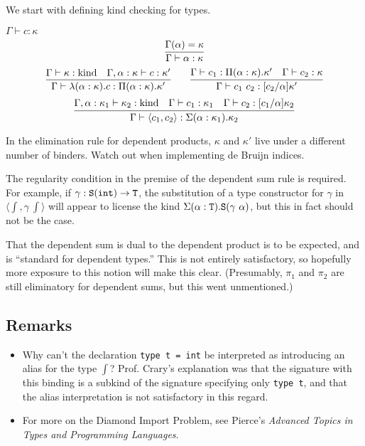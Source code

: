 We start with defining kind checking for types.
\begin{judgment}
  $\Gamma \vdash c : \kappa$
  \[
    \infer{\Gamma \vdash \alpha : \kappa}{\Gamma(\alpha) = \kappa}
  \]
  \[
    \infer{\Gamma \vdash \lambda(\alpha : \kappa).c : \Pi(\alpha : \kappa).\kappa'}
      {\Gamma \vdash \kappa : \kind
      &\Gamma, \alpha : \kappa \vdash c : \kappa'
      }
    \qquad
    \infer{\Gamma \vdash c_1~c_2 : [c_2 / \alpha]\kappa'}
      {\Gamma \vdash c_1 : \Pi(\alpha:\kappa).\kappa'
      &\Gamma \vdash c_2 : \kappa
      }
  \]
  \[
    \infer{\Gamma \vdash \langle c_1, c_2 \rangle : \Sigma(\alpha : \kappa_1).\kappa_2}
      {\Gamma, \alpha : \kappa_1 \vdash \kappa_2 : \kind
      &\Gamma \vdash c_1 : \kappa_1
      &\Gamma \vdash c_2 : [c_1/\alpha]\kappa_2
      }
  \]
\end{judgment}
In the elimination rule for dependent products, $\kappa$ and $\kappa'$ live under a different
number of binders. Watch out when implementing de Bruijn indices.

The regularity condition in the premise of the dependent sum rule is required.
For example, if $\gamma : \textnormal{\texttt{S}}(\textnormal{\texttt{int}}) \to \textnormal{\texttt{T}}$, the substitution of a type constructor for $\gamma$
in $\langle \int, \gamma~\int\rangle$ will appear to license the kind $\Sigma(\alpha:\textnormal{\texttt{T}}).\textnormal{\texttt{S}}(\gamma~\alpha)$,
but this in fact should not be the case.

That the dependent sum is dual to the dependent product is to be expected, and is
``standard for dependent types.'' This is not entirely satisfactory, so hopefully more
exposure to this notion will make this clear. (Presumably, $\pi_1$ and $\pi_2$ are
still eliminatory for dependent sums, but this went unmentioned.)

\subsection{Remarks}
\begin{itemize}
\item Why can't the declaration \texttt{type t = int} be interpreted as introducing an
  alias for the type $\int$? Prof\@. Crary's explanation was that the signature with this
  binding is a subkind of the signature specifying only \texttt{type t}, and that the
  alias interpretation is not satisfactory in this regard.
\item For more on the Diamond Import Problem, see Pierce's \emph{Advanced Topics in Types and
  Programming Languages}.
\end{itemize}
